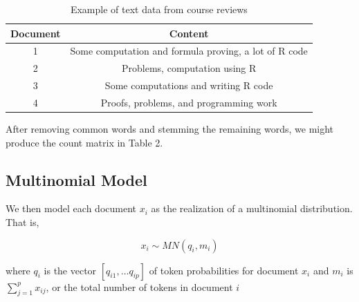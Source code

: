 \documentclass[12pt]{article}
\begin{document}
\begin{table}[!hbpt]
\caption{Example of text data from course reviews} \label{tab:title}
\begin{center}
\begin{tabular} {c c}
\textbf{Document} & \textbf{Content} \\
\hline
1 & Some computation and formula proving, a lot of R code \\
2 & Problems, computation using R \\
3 & Some computations and writing R code\\
4 & Proofs, problems, and programming work \\
\end{tabular}
\end{center}
\end{table}



After removing common words and stemming the remaining words, we might
produce the count matrix in Table 2. 


\begin{table}[!hbpt]
\caption{Creating a word-count matrix from text}
\begin{center}
\end{center}
\end{table} 



\subsection{Multinomial Model}\label{multinomial-model}

We then model each document $x_i$ as the realization of a multinomial
distribution. That is,

\[ x_{i} \sim MN(q_i,m_i) \]

where $q_i$ is the vector $[q_{i1}, \dots q_{ip}]$ of token
probabilities for document $x_i$ and $m_i$ is
$\sum_{j = 1}^{p}{x_{ij}}$, or the total number of tokens in document
$i$
\end{document}
